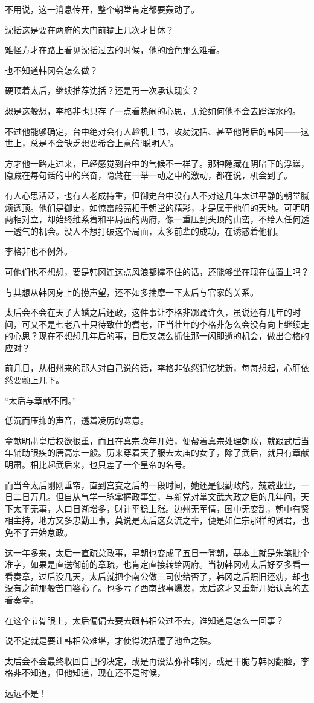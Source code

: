 不用说，这一消息传开，整个朝堂肯定都要轰动了。

沈括这是要在两府的大门前输上几次才甘休？

难怪方才在路上看见沈括过去的时候，他的脸色那么难看。

也不知道韩冈会怎么做？

硬顶着太后，继续推荐沈括？还是再一次承认现实？

想是这般想，李格非也只存了一点看热闹的心思，无论如何他不会去蹚浑水的。

不过他能够确定，台中绝对会有人趁机上书，攻劾沈括、甚至他背后的韩冈——这世上，总是不会缺乏想要希合上意的‘聪明人’。

方才他一路走过来，已经感觉到台中的气候不一样了。那种隐藏在阴暗下的浮躁，隐藏在每句话的中的兴奋，隐藏在一举一动之中的激动，都在说，机会到了。

有人心思活泛，也有人老成持重，但御史台中没有人不对这几年太过平静的朝堂腻烦透顶。他们是御史，如惊雷般亮相于朝堂的精彩，才是属于他们的天地。可明明两相对立，却始终维系着和平局面的两府，像一重压到头顶的山峦，不给人任何透一透气的机会。没人不想打破这个局面，太多前辈的成功，在诱惑着他们。

李格非也不例外。

可他们也不想想，要是韩冈连这点风浪都撑不住的话，还能够坐在现在位置上吗？

与其想从韩冈身上的捞声望，还不如多揣摩一下太后与官家的关系。

太后会不会在天子大婚之后还政，这件事让李格非踯躅许久，虽说还有几年的时间，可又不是七老八十只待致仕的耆老，正当壮年的李格非怎么会没有向上继续走的心思？现在不想想几年后的事，日后又怎么抓住那一闪即逝的机会，做出合格的应对？

前几日，从相州来的那人对自己说的话，李格非依然记忆犹新，每每想起，心肝依然要颤上几下。

“太后与章献不同。”

低沉而压抑的声音，透着凌厉的寒意。

章献明肃皇后权欲很重，而且在真宗晚年开始，便帮着真宗处理朝政，就跟武后当年辅助眼疾的唐高宗一般。历来穿着天子服去太庙的女子，除了武后，就只有章献明肃。相比起武后来，也只差了一个皇帝的名号。

而当今太后刚刚垂帘，直到宫变之后的一段时间，她还是很勤政的。兢兢业业，一日二日万几。但自从气学一脉掌握政事堂，与新党对掌文武大政之后的几年间，天下太平无事，人口日渐增多，财计平稳上涨。边州无军情，国中无变乱，朝中有贤相主持，地方又多忠勤王事，莫说是太后这女流之辈，便是如仁宗那样的贤君，也免不了开始怠政。

这一年多来，太后一直疏怠政事，早朝也变成了五日一登朝，基本上就是朱笔批个准字，如果是直送御前的章疏，也肯定直接转给两府。当初韩冈劝太后好歹多看一看奏章，过后没几天，太后就把李南公做三司使给否了，韩冈之后照旧还劝，却也没有之前那般苦口婆心了。也多亏了西南战事爆发，太后这才又重新开始认真的去看奏章。

在这个节骨眼上，太后偏偏去要去跟韩相公过不去，谁知道是怎么一回事？

说不定就是要让韩相公难堪，才使得沈括遭了池鱼之殃。

太后会不会最终收回自己的决定，或是再设法弥补韩冈，或是干脆与韩冈翻脸，李格非不知道，但他知道，现在还不是时候，

远远不是！
